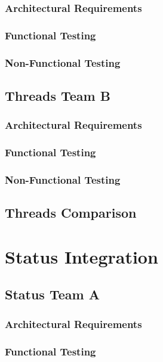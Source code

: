 \documentclass[12pt, oneside]{article}
\begin{document}
		\subsubsection{Architectural Requirements}
			
		\subsubsection{Functional Testing}
			
		\subsubsection{Non-Functional Testing }
			
	
	\subsection{Threads Team B}	
		\subsubsection{Architectural Requirements}
			
		\subsubsection{Functional Testing}
			
		\subsubsection{Non-Functional Testing }
			
	
	\subsection{Threads Comparison}
\newpage 
\section{Status Integration}
	\subsection{Status Team A}	
		\subsubsection{Architectural Requirements}
			
		\subsubsection{Functional Testing}
			
\end{document}
